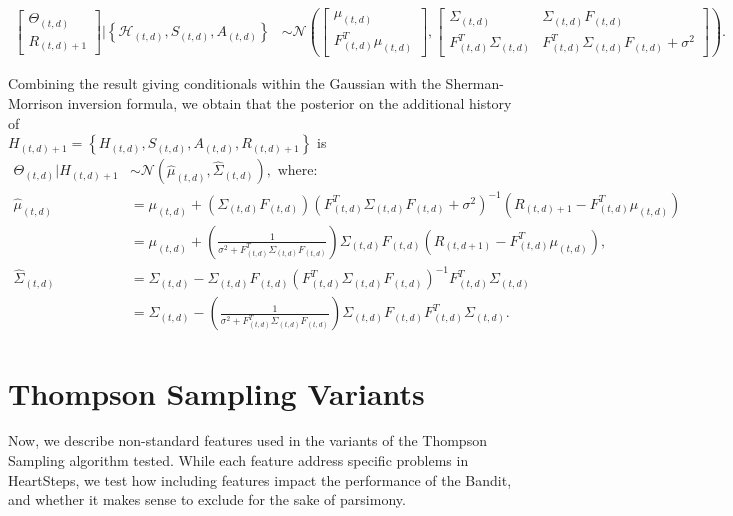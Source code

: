 \begin{align}
	\begin{bmatrix} \Theta_{(t,d)} \\
R_{(t,d)+1}
\end{bmatrix} | \left\{\mathcal{H}_{(t,d)}, S_{(t,d)}, A_{(t,d)} \right\} &\sim \mathcal{N} \left( \begin{bmatrix} \mu_{(t,d)} \\
F_{(t,d)}^T \mu_{(t,d)}
\end{bmatrix}, \begin{bmatrix} \Sigma_{(t,d)} & \Sigma_{(t,d)} F_{(t,d)} \\
F_{(t,d)}^T \Sigma_{(t,d)} & F_{(t,d)}^T \Sigma_{(t,d)} F_{(t,d)} + \sigma^2
\end{bmatrix}\right).
\end{align}

Combining the result giving conditionals within the Gaussian with the Sherman-Morrison inversion formula, we obtain that the posterior on the additional history of \\
\noindent $H_{(t,d)+1} = \left\{H_{(t,d)}, S_{(t,d)}, A_{(t,d)}, R_{(t,d)+1} \right\}$ is
\begin{align*}
	\Theta_{(t,d)} | H_{(t,d)+1} &\sim \mathcal{N}\left(\hat{\mu}_{(t,d)}, \hat{\Sigma}_{(t,d)}\right), \text{ where}: \\
	\hat{\mu}_{(t,d)} &= \mu_{(t,d)} + \left(\Sigma_{(t,d)} F_{(t,d)}\right) \left(F_{(t,d)}^T \Sigma_{(t,d)} F_{(t,d)} + \sigma^2  \right)^{-1} (R_{(t,d)+1} - F_{(t,d)}^T \mu_{(t,d)}) \\
	&= \mu_{(t,d)} + \left(\frac{1}{\sigma^2 + F_{(t,d)}^T \Sigma_{(t,d)} F_{(t,d)}} \right)\Sigma_{(t,d)} F_{(t,d)} (R_{(t,d+1)} - F_{(t,d)}^T \mu_{(t,d)}), \\
	\hat{\Sigma}_{(t,d)} &= \Sigma_{(t,d)} - \Sigma_{(t,d)} F_{(t,d)} \left(F_{(t,d)}^T \Sigma_{(t,d)} F_{(t,d)}\right)^{-1} F_{(t,d)}^T \Sigma_{(t,d)}\\
	&= \Sigma_{(t,d)} - \left(\frac{1}{\sigma^2 + F_{(t,d)}^T \Sigma_{(t,d)} F_{(t,d)}} \right) \Sigma_{(t,d)} F_{(t,d)} F_{(t,d)}^T \Sigma_{(t,d)}.
\end{align*}



\section{Thompson Sampling Variants}
\label{Models/Bandit Algorithm Variants}

Now, we describe non-standard features used in the variants of the Thompson Sampling algorithm tested.  While each feature address specific problems in HeartSteps, we test how including features impact the performance of the Bandit, and whether it makes sense to exclude for the sake of parsimony.

